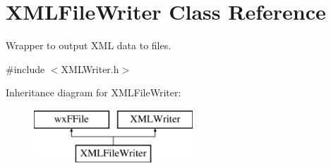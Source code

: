 \hypertarget{class_x_m_l_file_writer}{}\section{X\+M\+L\+File\+Writer Class Reference}
\label{class_x_m_l_file_writer}


Wrapper to output X\+ML data to files.  




{\ttfamily \#include $<$X\+M\+L\+Writer.\+h$>$}

Inheritance diagram for X\+M\+L\+File\+Writer\+:\begin{figure}[H]
\begin{center}
\leavevmode
\includegraphics[height=2.000000cm]{class_x_m_l_file_writer}
\end{center}
\end{figure}
